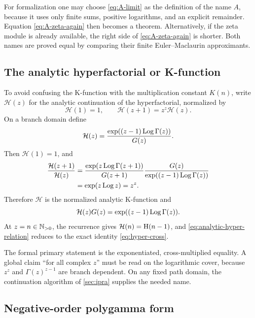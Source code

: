 For formalization one may choose \cref{eq:A-limit} as the definition of the
name \(A\), because it uses only finite sums, positive logarithms, and an
explicit remainder.  Equation \cref{eq:A-zeta-again} then becomes a theorem.
Alternatively, if the zeta module is already available, the right side of
\cref{eq:A-zeta-again} is shorter.  Both names are proved equal by comparing
their finite Euler--Maclaurin approximants.

\subsection{The analytic hyperfactorial or K-function}

To avoid confusing the K-function with the multiplication constant \(K(n)\),
write \(\mathcal H(z)\) for the analytic continuation of the hyperfactorial,
normalized by
\begin{equation}\label{eq:analytic-hyper-recurrence}
 \mathcal H(1)=1,
 \qquad
 \mathcal H(z+1)=z^z\mathcal H(z).
\end{equation}
On a branch domain define
\begin{equation}\label{eq:analytic-hyper-def}
 \mathcal H(z)=
 \frac{\exp((z-1)\operatorname{Log}\Gamma(z))}{G(z)}.
\end{equation}
Then \(\mathcal H(1)=1\), and
\begin{align*}
 \frac{\mathcal H(z+1)}{\mathcal H(z)}
 &=\frac{\exp(z\operatorname{Log}\Gamma(z+1))}{G(z+1)}
   \frac{G(z)}{\exp((z-1)\operatorname{Log}\Gamma(z))}\\
 &=\exp(z\operatorname{Log} z)=z^z.
\end{align*}
Therefore \(\mathcal H\) is the normalized analytic K-function and
\begin{equation}\label{eq:analytic-hyper-relation}
 \mathcal H(z)G(z)=\exp((z-1)\operatorname{Log}\Gamma(z)).
\end{equation}
At \(z=n\in\mathbb N_{>0}\), the recurrence gives
\(\mathcal H(n)=\operatorname{H}(n-1)\), and \cref{eq:analytic-hyper-relation} reduces to
the exact identity \cref{eq:hyper-cross}.

The formal primary statement is the exponentiated, cross-multiplied equality.
A global claim ``for all complex \(z\)'' must be read on the logarithmic
cover, because \(z^z\) and \(\Gamma(z)^{z-1}\) are branch dependent.  On any
fixed path domain, the continuation algorithm of \cref{sec:ipra} supplies the
needed name.

\subsection{Negative-order polygamma form}


